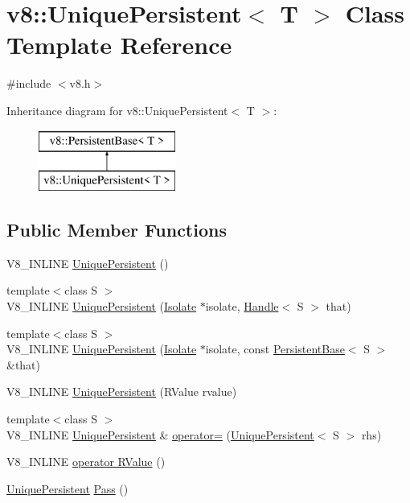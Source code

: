 \hypertarget{classv8_1_1_unique_persistent}{}\section{v8\+:\+:Unique\+Persistent$<$ T $>$ Class Template Reference}
\label{classv8_1_1_unique_persistent}


{\ttfamily \#include $<$v8.\+h$>$}

Inheritance diagram for v8\+:\+:Unique\+Persistent$<$ T $>$\+:\begin{figure}[H]
\begin{center}
\leavevmode
\includegraphics[height=2.000000cm]{classv8_1_1_unique_persistent}
\end{center}
\end{figure}
\subsection*{Public Member Functions}
\begin{DoxyCompactItemize}
\item 
V8\+\_\+\+I\+N\+L\+I\+N\+E \hyperlink{classv8_1_1_unique_persistent_adab1460f2350842ea97e9ac63b3b3692}{Unique\+Persistent} ()
\item 
{\footnotesize template$<$class S $>$ }\\V8\+\_\+\+I\+N\+L\+I\+N\+E \hyperlink{classv8_1_1_unique_persistent_af7dbba9e4b73104d0a1950c215426a57}{Unique\+Persistent} (\hyperlink{classv8_1_1_isolate}{Isolate} $\ast$isolate, \hyperlink{classv8_1_1_handle}{Handle}$<$ S $>$ that)
\item 
{\footnotesize template$<$class S $>$ }\\V8\+\_\+\+I\+N\+L\+I\+N\+E \hyperlink{classv8_1_1_unique_persistent_a795e5299871d11469dc2e1c637eb76fa}{Unique\+Persistent} (\hyperlink{classv8_1_1_isolate}{Isolate} $\ast$isolate, const \hyperlink{classv8_1_1_persistent_base}{Persistent\+Base}$<$ S $>$ \&that)
\item 
V8\+\_\+\+I\+N\+L\+I\+N\+E \hyperlink{classv8_1_1_unique_persistent_a73c1edaf902755a71c1236f91388ef5a}{Unique\+Persistent} (R\+Value rvalue)
\item 
{\footnotesize template$<$class S $>$ }\\V8\+\_\+\+I\+N\+L\+I\+N\+E \hyperlink{classv8_1_1_unique_persistent}{Unique\+Persistent} \& \hyperlink{classv8_1_1_unique_persistent_aa533c3aff16091f332a0f892a658e70c}{operator=} (\hyperlink{classv8_1_1_unique_persistent}{Unique\+Persistent}$<$ S $>$ rhs)
\item 
V8\+\_\+\+I\+N\+L\+I\+N\+E \hyperlink{classv8_1_1_unique_persistent_a06e8c1c5be0b982a02e48e81df0b9794}{operator R\+Value} ()
\item 
\hyperlink{classv8_1_1_unique_persistent}{Unique\+Persistent} \hyperlink{classv8_1_1_unique_persistent_ace8f7fa76e5d36afd3ae8ee94acff00f}{Pass} ()
\end{DoxyCompactItemize}


